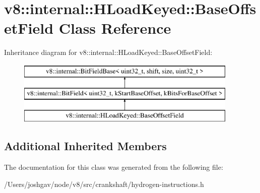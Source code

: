 \hypertarget{classv8_1_1internal_1_1_h_load_keyed_1_1_base_offset_field}{}\section{v8\+:\+:internal\+:\+:H\+Load\+Keyed\+:\+:Base\+Offset\+Field Class Reference}
\label{classv8_1_1internal_1_1_h_load_keyed_1_1_base_offset_field}
Inheritance diagram for v8\+:\+:internal\+:\+:H\+Load\+Keyed\+:\+:Base\+Offset\+Field\+:\begin{figure}[H]
\begin{center}
\leavevmode
\includegraphics[height=3.000000cm]{classv8_1_1internal_1_1_h_load_keyed_1_1_base_offset_field}
\end{center}
\end{figure}
\subsection*{Additional Inherited Members}


The documentation for this class was generated from the following file\+:\begin{DoxyCompactItemize}
\item 
/\+Users/joshgav/node/v8/src/crankshaft/hydrogen-\/instructions.\+h\end{DoxyCompactItemize}
